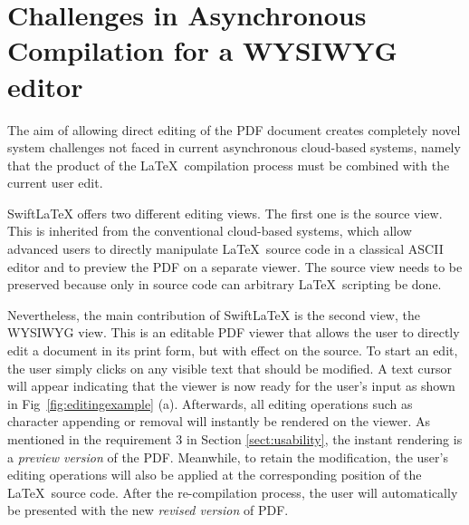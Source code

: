 \documentclass[sigconf]{acmart}
\begin{document}



\section{Challenges in Asynchronous Compilation for a WYSIWYG editor} \label{sect:challenges}

The aim of allowing direct editing of the PDF document creates completely novel system challenges not faced in current asynchronous cloud-based systems, namely that the product of the \LaTeX\ compilation process must be combined with the current user edit. 


SwiftLaTeX offers two different editing views. The first one is the source view. 
This is inherited from the conventional cloud-based systems, which allow advanced users to directly manipulate \LaTeX\ source code in a classical ASCII editor and to preview the PDF on a separate viewer. 
The source view needs to be preserved because only in source code can arbitrary \LaTeX\ scripting be done.  %

Nevertheless, the main contribution of SwiftLaTeX is the second view, the WYSIWYG view.
This is an editable PDF viewer that allows the user to directly edit a document in its print form, but with effect on the source.
To start an edit, the user simply clicks on any visible text that should be modified. 
A text cursor will appear indicating that the viewer is now ready for the user's input as shown in Fig~\ref{fig:editingexample} (a).
Afterwards, all editing operations such as character appending or removal will instantly be  rendered on the viewer.
As mentioned in the requirement 3 in Section \ref{sect:usability},  the instant rendering is a \textit{preview version} of the PDF.
Meanwhile, to retain the modification, the user's editing operations will also be applied at the corresponding position of the \LaTeX\ source code. After the re-compilation process, the user will automatically be presented with the new \textit{revised version} of PDF. 
\end{document}
